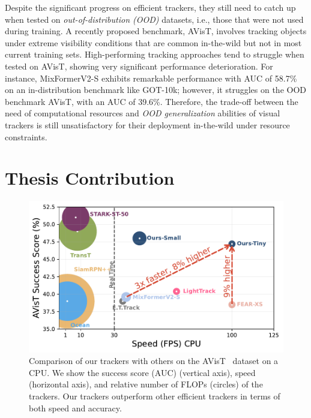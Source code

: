 Despite the significant progress on efficient trackers, they still need to catch up when tested on \emph{out-of-distribution (OOD)} datasets, i.e., those that were not used during training. A recently proposed benchmark, AVisT\cite{noman2022avist}, involves tracking objects under extreme visibility conditions that are common in-the-wild but not in most current training sets. High-performing tracking approaches tend to struggle when tested on AVisT, showing very significant performance deterioration. For instance, MixFormerV2-S exhibits remarkable performance with AUC of 58.7\% on an in-distribution benchmark like GOT-10k\cite{Huang2021}; however, it struggles on the OOD benchmark AVisT, with an AUC of 39.6\%. Therefore, the trade-off between the need of computational resources and \emph{OOD generalization} abilities of visual trackers is still unsatisfactory for their deployment in-the-wild under resource constraints.  


\section{Thesis Contribution}

\begin{figure}
    \centering
        \includegraphics[width=1.0\textwidth]{figures/avist_comparison_fig_new.pdf}
    \caption{Comparison of our trackers with others on the AVisT~\cite{noman2022avist} dataset on a CPU. We show the success score (AUC) (vertical axis), speed (horizontal axis), and relative number of FLOPs (circles) of the trackers. Our trackers outperform other efficient trackers in terms of both speed and accuracy.}
    \label{fig:avist_comparision_fig}
\end{figure}

